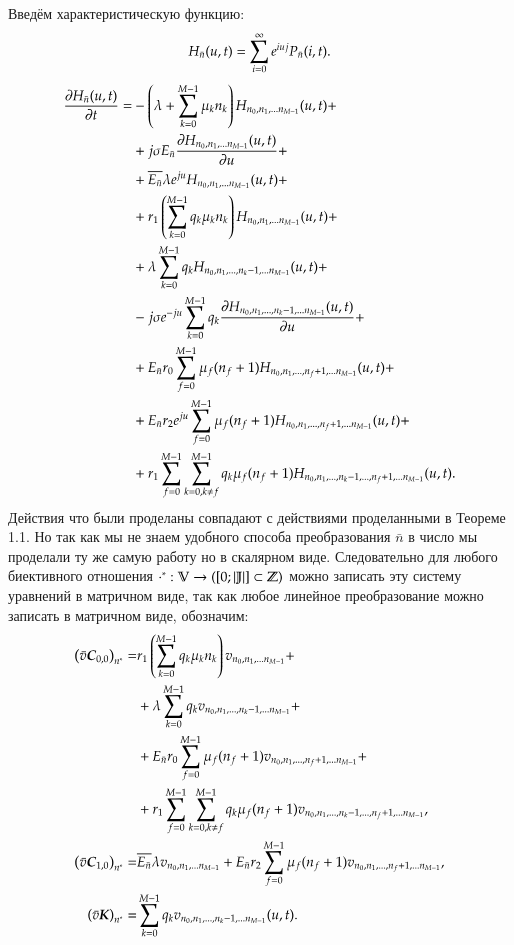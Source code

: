 Введём характеристическую функцию:
\[{H}_{\bar{n}}(u,t)=\sum_{i=0}^\infty e^{iuj}{P}_{\bar{n}}(i,t).\]
\begin{equation*}\begin{aligned}
\pdv{{H}_{\bar{n}}(u,t)}{t}=
    &-\left( {\lambda+\sum_{{k}=0}^{M-1}\mu_{k}{n}_{k}} \right){H}_{{n}_0, {n}_1, ... {n}_{M-1}}(u,t)+\\
    &+j \sigma E_{\bar{n}} \pdv{ {H}_{{n}_0, {n}_1, ... {n}_{M-1}} (u,t)}{u}(i,t) + \\
    &+\overline{E_{\bar{n}}} \lambda e^{ju} {H}_{{n}_0, {n}_1, ... {n}_{M-1}}(u,t)+\\
    &+r_1 \left( {\sum_{{k}=0}^{M-1} q_{k}\mu_{k}{n}_{k}} \right) {H}_{{n}_0, {n}_1, ... {n}_{M-1}}(u,t) + \\
    &+\lambda\sum_{k=0}^{M-1}q_k {H}_{{n}_0, {n}_1, ... , {n}_{k} - 1, ... {n}_{M-1}}(u,t) + \\
    &-j \sigma  e^{-ju} \sum_{k=0}^{M-1}q_k \pdv{ {H}_{{n}_0, {n}_1, ... , {n}_{k} - 1, ... {n}_{M-1}} (u,t)}{u} + \\
    &+E_{\bar{n}} r_0 \sum_{f=0}^{M-1} \mu_f (n_f + 1) {H}_{{n}_0, {n}_1, ... , {n}_{f} + 1, ... {n}_{M-1}}(u,t) + \\
    &+E_{\bar{n}} r_2 e^{ju} \sum_{f=0}^{M-1} \mu_f (n_f + 1) {H}_{{n}_0, {n}_1, ... , {n}_{f} + 1, ... {n}_{M-1}}(u,t) + \\
    &+r_1 \sum_{{f}=0}^{M-1} \sum_{{k}=0, {k} \neq {f}}^{M-1}
        q_k \mu_f (n_f+1) {H}_{{n}_0, {n}_1, ... , {n}_{k} - 1, ... , {n}_{f} + 1, ... {n}_{M-1}}(u,t).
\end{aligned}\end{equation*}
Действия что были проделаны совпадают с действиями проделанными в Теореме 1.1.
Но так как мы не знаем удобного способа преобразования \(\bar{n}\) 
в число мы проделали ту же самую работу но в скалярном виде.
Следовательно для любого биективного отношения
\(\cdot^* : \mathbb{V} \rightarrow ([0;|\mathbb{J}|] \subset \mathbb{Z} )\)
можно записать эту систему уравнений в матричном виде,
так как любое линейное преобразование можно записать в
матричном виде, обозначим:
\begin{equation}\begin{aligned}
\left( {\bar{v}\boldsymbol{C}_{0,0}} \right)_{n^*} =&
    r_1 \left( {\sum_{{k}=0}^{M-1} q_{k}\mu_{k}{n}_{k}} \right) {v}_{{n}_0, {n}_1, ... {n}_{M-1}} + \\
    &+\lambda\sum_{k=0}^{M-1}q_k {v}_{{n}_0, {n}_1, ... , {n}_{k} - 1, ... {n}_{M-1}} + \\
    &+E_{\bar{n}} r_0 \sum_{f=0}^{M-1} \mu_f (n_f + 1) {v}_{{n}_0, {n}_1, ... , {n}_{f} + 1, ... {n}_{M-1}} + \\
    &+r_1 \sum_{{f}=0}^{M-1} \sum_{{k}=0, {k} \neq {f}}^{M-1} q_k \mu_f (n_f+1) {v}_{{n}_0, {n}_1, ... , {n}_{k} - 1, ... , {n}_{f} + 1, ... {n}_{M-1}}, \\
\left( {\bar{v}\boldsymbol{C}_{1,0}} \right)_{n^*} =
    &\overline{E_{\bar{n}}} \lambda {v}_{{n}_0, {n}_1, ... {n}_{M-1}}+
    E_{\bar{n}} r_2 \sum_{f=0}^{M-1} \mu_f (n_f + 1) {v}_{{n}_0, {n}_1, ... , {n}_{f} + 1, ... {n}_{M-1}}, \\
\left( {\bar{v}\boldsymbol{K}} \right)_{n^*} =
    &\sum_{k=0}^{M-1}q_k{v}_{{n}_0, {n}_1, ... , {n}_{k} - 1, ... {n}_{M-1}}(u,t).
\end{aligned}\end{equation}
